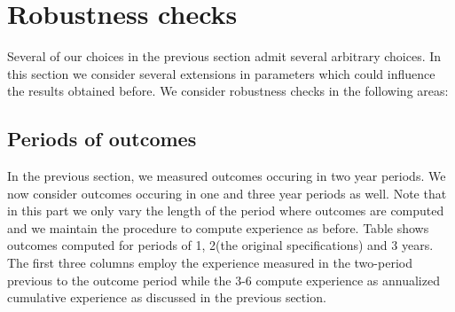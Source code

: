 %
\section{Robustness checks}
Several of our choices in the previous section admit several arbitrary choices. In this section we consider several extensions in parameters which could influence the results obtained before. We consider robustness checks in the following areas:

\subsection{Periods of outcomes}
In the previous section, we measured outcomes occuring in two year periods. We now consider outcomes occuring in one and three year periods as well. Note that in this part we only vary the length of the period where outcomes are computed and we maintain the procedure to compute experience as before. Table shows outcomes computed for periods of 1, 2(the original specifications) and 3 years. The first three columns employ the experience measured in the two-period previous to the outcome period while the 3-6 compute experience as annualized cumulative experience as discussed in the previous section.


